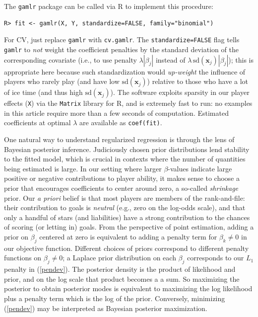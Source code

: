 The {\tt gamlr} package \cite{gamlr} can
be called via {\sf R} to implement this procedure:
\begin{verbatim}
R> fit <- gamlr(X, Y, standardize=FALSE, family="binomial")
\end{verbatim}
For CV, just replace \verb!gamlr! with \verb!cv.gamlr!. The
\verb!standardize=FALSE! flag tells \verb!gamlr! to \textit{not} weight the
coefficient penalties by the standard deviation of the corresponding covariate
(i.e., to use penalty $\lambda|\beta_j|$ instead of
$\lambda\,\mathrm{sd}(\mathbf{x}_j)|\beta_j|$); this is appropriate here because
such standardization would \textit{up-weight} the influence of players who
rarely play (and have low $\mathrm{sd}(\mathbf{x}_j)$) relative to those who
have a lot of ice time (and thus high $\mathrm{sd}(\mathbf{x}_j)$).  The
software exploits sparsity in our player effects (\verb!X!) via the
\verb!Matrix! library for {\sf R}, and is extremely fast to run: no examples
in this article require more than a few seconds of computation. Estimated
coefficients at optimal $\lambda$ are available as \verb!coef(fit)!.


One natural way to understand regularized regression is through the lens of
Bayesian posterior inference. Judiciously chosen prior distributions lend
stability to the fitted model, which is crucial in contexts where the number
of quantities being estimated is large. In our setting where larger
$\beta$-values indicate large positive or negative contributions to player
ability, it makes sense to choose a prior that encourages coefficients to
center around zero, a so-called {\em shrinkage} prior.  Our {\em a priori}
belief is that most players are members of the rank-and-file: their
contribution to goals is {\em neutral} (e.g., zero on the log-odds scale), and
that only a handful of stars (and liabilities) have a strong contribution to
the chances of scoring (or letting in) goals.  From the perspective of point
estimation, adding a prior on $\beta_j$ centered at zero is equivalent to
adding a penalty term for $\beta_k \ne 0$ in our objective function. Different
choices of priors correspond to different penalty functions on $\beta_j \ne
0$; a Laplace prior distribution on each $\beta_j$  corresponds to our $L_1$
penalty in (\ref{pendev}). The posterior density is the product of likelihood
and prior, and on the log scale that product becomes a a sum. So maximizing
the posterior to obtain posterior modes is equivalent to maximizing the log
likelihood plus a penalty term which is the log of the prior. Conversely, 
minimizing (\ref{pendev}) may be interpreted as Bayesian
posterior maximization.

